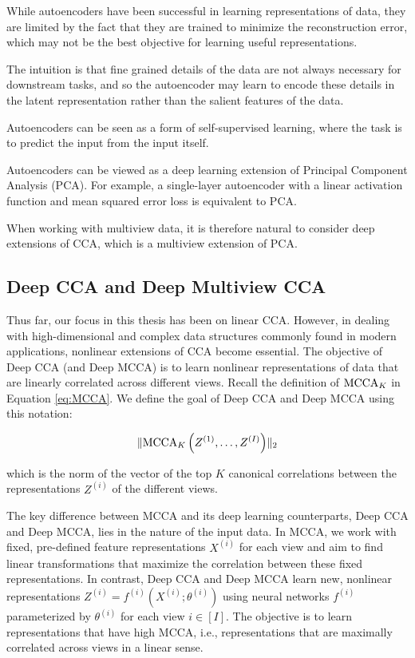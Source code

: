While autoencoders have been successful in learning representations of data, they are limited by the fact that they are trained to minimize the reconstruction error, which may not be the best objective for learning useful representations.

The intuition is that fine grained details of the data are not always necessary for downstream tasks, and so the autoencoder may learn to encode these details in the latent representation rather than the salient features of the data.

Autoencoders can be seen as a form of self-supervised learning, where the task is to predict the input from the input itself.

Autoencoders can be viewed as a deep learning extension of Principal Component Analysis (PCA). For example, a single-layer autoencoder with a linear activation function and mean squared error loss is equivalent to PCA.

When working with multiview data, it is therefore natural to consider deep extensions of CCA, which is a multiview extension of PCA.

\subsection{Deep CCA and Deep Multiview CCA}

Thus far, our focus in this thesis has been on linear CCA. However, in dealing with high-dimensional and complex data structures commonly found in modern applications, nonlinear extensions of CCA become essential.
The objective of Deep CCA (and Deep MCCA) is to learn nonlinear representations of data that are linearly correlated across different views. Recall the definition of $\operatorname{MCCA}_K$ in Equation \eqref{eq:MCCA}. We define the goal of Deep CCA and Deep MCCA using this notation:

\begin{align}
    \label{eq:DMCCA-def}
    \lVert\operatorname{MCCA}_K\left(Z^{(1)}, \ldots, Z^{(I)}\right)\rVert_2
\end{align}

which is the norm of the vector of the top $K$ canonical correlations between the representations $Z^{(i)}$ of the different views.

The key difference between MCCA and its deep learning counterparts, Deep CCA and Deep MCCA, lies in the nature of the input data. In MCCA, we work with fixed, pre-defined feature representations $X^{(i)}$ for each view and aim to find linear transformations that maximize the correlation between these fixed representations. In contrast, Deep CCA and Deep MCCA learn new, nonlinear representations $Z^{(i)} = f^{(i)}(X^{(i)}; \theta^{(i)})$ using neural networks $f^{(i)}$ parameterized by $\theta^{(i)}$ for each view $i \in [I]$. The objective is to learn representations that have high MCCA, i.e., representations that are maximally correlated across views in a linear sense.

